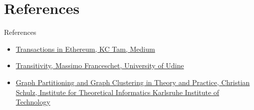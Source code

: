 \documentclass{beamer}
\begin{document}
    \section{References}\label{sec:references}

    \begin{frame}{References}
        \begin{itemize}
            \item \href{https://medium.com/@kctheservant/transactions-in-ethereum-e85a73068f74}{Transactions in Ethereum, KC Tam, Medium}
            \item \href{https://www.sci.unich.it/~francesc/teaching/network/transitivity.html}{Transitivity, Massimo Franceschet, University of Udine}
            \item \href{http://algo2.iti.kit.edu/schulz/gpgc_vorlesung/graphpartitioning_lecture.pdf}{Graph Partitioning and Graph Clustering in Theory and Practice, Christian Schulz, Institute for Theoretical Informatics Karlsruhe Institute of Technology}
        \end{itemize}
    \end{frame}
\end{document}
